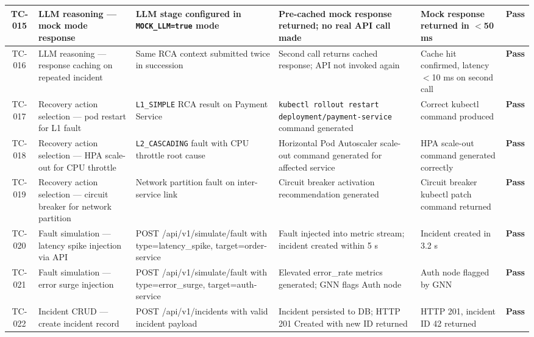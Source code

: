 \begin{center}
\begin{longtable}{|c|>{\RaggedRight\arraybackslash}p{3.2cm}|>{\RaggedRight\arraybackslash}p{3.5cm}|>{\RaggedRight\arraybackslash}p{3.5cm}|>{\RaggedRight\arraybackslash}p{2.2cm}|c|}
TC-015 & LLM reasoning — mock mode response & LLM stage configured in \texttt{MOCK\_LLM=true} mode & Pre-cached mock response returned; no real API call made & Mock response returned in $<$50 ms & \textbf{Pass} \\
\hline

TC-016 & LLM reasoning — response caching on repeated incident & Same RCA context submitted twice in succession & Second call returns cached response; API not invoked again & Cache hit confirmed, latency $<$10 ms on second call & \textbf{Pass} \\
\hline

TC-017 & Recovery action selection — pod restart for L1 fault & \texttt{L1\_SIMPLE} RCA result on Payment Service & \texttt{kubectl rollout restart deployment/payment-service} command generated & Correct kubectl command produced & \textbf{Pass} \\
\hline

TC-018 & Recovery action selection — HPA scale-out for CPU throttle & \texttt{L2\_CASCADING} fault with CPU throttle root cause & Horizontal Pod Autoscaler scale-out command generated for affected service & HPA scale-out command generated correctly & \textbf{Pass} \\
\hline

TC-019 & Recovery action selection — circuit breaker for network partition & Network partition fault on inter-service link & Circuit breaker activation recommendation generated & Circuit breaker kubectl patch command returned & \textbf{Pass} \\
\hline

TC-020 & Fault simulation — latency spike injection via API & POST /api/v1/simulate/fault with type=latency\_spike, target=order-service & Fault injected into metric stream; incident created within 5 s & Incident created in 3.2 s & \textbf{Pass} \\
\hline

TC-021 & Fault simulation — error surge injection & POST /api/v1/simulate/fault with type=error\_surge, target=auth-service & Elevated error\_rate metrics generated; GNN flags Auth node & Auth node flagged by GNN & \textbf{Pass} \\
\hline

TC-022 & Incident CRUD — create incident record & POST /api/v1/incidents with valid incident payload & Incident persisted to DB; HTTP 201 Created with new ID returned & HTTP 201, incident ID 42 returned & \textbf{Pass} \\
\hline


\end{longtable}
\end{center}
